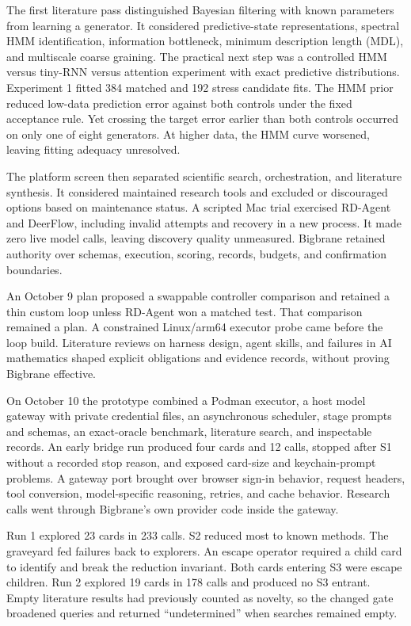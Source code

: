 The first literature pass distinguished Bayesian filtering with known parameters from learning a generator. It considered predictive-state representations, spectral HMM identification, information bottleneck, minimum description length (MDL), and multiscale coarse graining. The practical next step was a controlled HMM versus tiny-RNN versus attention experiment with exact predictive distributions. Experiment 1 fitted 384 matched and 192 stress candidate fits. The HMM prior reduced low-data prediction error against both controls under the fixed acceptance rule. Yet crossing the target error earlier than both controls occurred on only one of eight generators. At higher data, the HMM curve worsened, leaving fitting adequacy unresolved.

The platform screen then separated scientific search, orchestration, and literature synthesis. It considered maintained research tools and excluded or discouraged options based on maintenance status. A scripted Mac trial exercised RD-Agent and DeerFlow, including invalid attempts and recovery in a new process. It made zero live model calls, leaving discovery quality unmeasured. Bigbrane retained authority over schemas, execution, scoring, records, budgets, and confirmation boundaries.

An October 9 plan proposed a swappable controller comparison and retained a thin custom loop unless RD-Agent won a matched test. That comparison remained a plan. A constrained Linux/arm64 executor probe came before the loop build. Literature reviews on harness design, agent skills, and failures in AI mathematics shaped explicit obligations and evidence records, without proving Bigbrane effective.

On October 10 the prototype combined a Podman executor, a host model gateway with private credential files, an asynchronous scheduler, stage prompts and schemas, an exact-oracle benchmark, literature search, and inspectable records. An early bridge run produced four cards and 12 calls, stopped after S1 without a recorded stop reason, and exposed card-size and keychain-prompt problems. A gateway port brought over browser sign-in behavior, request headers, tool conversion, model-specific reasoning, retries, and cache behavior. Research calls went through Bigbrane's own provider code inside the gateway.

Run 1 explored 23 cards in 233 calls. S2 reduced most to known methods. The graveyard fed failures back to explorers. An escape operator required a child card to identify and break the reduction invariant. Both cards entering S3 were escape children. Run 2 explored 19 cards in 178 calls and produced no S3 entrant. Empty literature results had previously counted as novelty, so the changed gate broadened queries and returned ``undetermined'' when searches remained empty.

